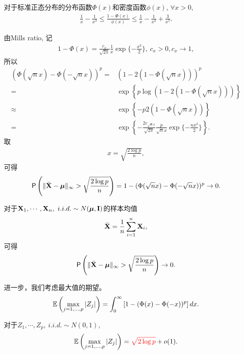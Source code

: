 \begin{lem}
	对于标准正态分布的分布函数$\Phi(x)$和密度函数$\phi(x)$, $\forall x >0$,
	\begin{align*}
		\frac{1}{x}-\frac{1}{x^3} \leq \frac{1-\Phi(x)}{\phi(x)} \leq \frac{1}{x}-\frac{1}{x^3}+\frac{3}{x^5}.
	\end{align*}		
\end{lem}
由Mills ratio, 记
\begin{align*}
	1-\Phi(x)=\frac{c_x}{\sqrt{2\pi}} \frac{1}{x}\exp\{-\frac{x^2}{2}\},~c_x>0, c_x \to 1,
	\end{align*}
所以
\begin{align*}
	(\Phi(\sqrt{n} x)-\Phi(-\sqrt{n} x))^p=&\left(1-2(1-\Phi(\sqrt{n}x))   \right)^p\\
	=&\exp\left\{p \log\left(1-2(1-\Phi(\sqrt{n}x))   \right) \right\}\\
	\approx &\exp\left\{-p 2\left(1-\Phi(\sqrt{n}x)   \right) \right\}\\
	=& \exp\left\{-\frac{2 c_{\sqrt{n}x}}{\sqrt{2\pi}} \frac{p}{\sqrt{n}x}\exp\{-\frac{nx^2}{2}\} \right\}.
	\end{align*}	
取
\begin{align*}
	x=\sqrt{\frac{2\log p}{n}},
\end{align*}
可得
\begin{align*}
	\textsf{P}\left(\|\bar{{\bf X}}-\mbox{\boldmath $\mu$}\|_\infty>\sqrt{\frac{2\log p}{n}}\right)=1-(\Phi(\sqrt{n} x)-\Phi(-\sqrt{n} x))^p \to 0.
\end{align*}
\begin{prop}
对于${\bf X}_1,\cdots, {\bf X}_n,~i.i.d.\sim N(\mbox{\boldmath $\mu$}, {\bf I})$的样本均值
	\begin{align*}
		\bar{{\bf X}}=\frac{1}{n} \sum_{i=1}^n {\bf X}_i,
	\end{align*}	
可得	
\begin{align*}
	\textsf{P}\left(\|\bar{{\bf X}}-\mbox{\boldmath $\mu$}\|_\infty>\sqrt{\frac{2\log p}{n}}\right) \to 0.
\end{align*}
\end{prop}

进一步，我们考虑最大值的期望。
\begin{align*}
\mathbb{E} \left( \max_{j=1,\ldots,p} |Z_j| \right)=\int_0^\infty \left[ 1-(\Phi(x)-\Phi(-x))^p\right]dx.
\end{align*}
\begin{prop}
	对于$Z_1,\cdots, Z_p,~i.i.d.\sim N(0,1)$,
	\begin{align*}
		\mathbb{E} \left( \max_{j=1,\ldots,p} |Z_j| \right)=\textcolor{red}{\sqrt{2 \log p}}+o(1).
	\end{align*}
	\end{prop}

